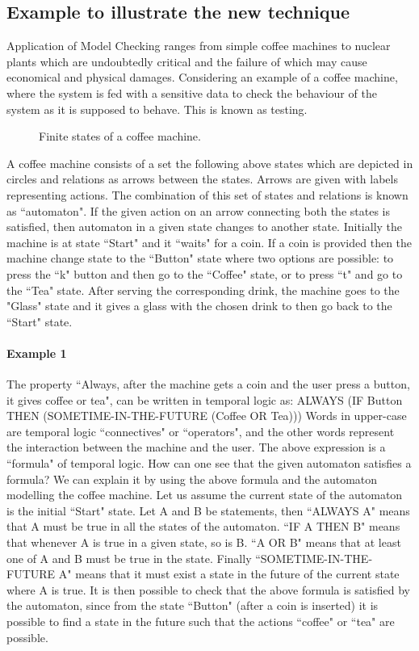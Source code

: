 \documentclass[a4paper,12pt]{extarticle}
\begin{document}
\subsection{Example to illustrate the new technique}
\label{Example}
Application of Model Checking ranges from simple coffee machines to nuclear plants which are undoubtedly critical and the failure of which may cause economical and physical damages. Considering an example of a coffee machine, where the system is fed with a sensitive data to check the behaviour of the system as it is supposed to behave. This is known as testing. 
 \begin{figure}[h!]
 \centering
\caption{Finite states of a coffee machine.}
 \end{figure}
 A coffee machine consists of a set the following above states which are depicted in circles and relations as arrows between the states. Arrows are given with labels representing actions. The combination of this set of states and relations is known as ``automaton".  If the given action on an arrow connecting both the states is satisfied, then automaton in a given state changes to another state. 
Initially the machine is at state ``Start" and it ``waits" for a coin. If a coin is provided then the machine change state to the ``Button" state where two options are possible: to press the ``k" button and then go to the ``Coffee" state, or to press ``t" and go to the ``Tea" state. After serving the corresponding drink, the machine goes to the "Glass" state and it gives a glass with the chosen drink to then go back to the ``Start" state.
\paragraph{Example 1}
The property ``Always, after the machine gets a coin and the user press a button, it gives coffee or tea", can be written in temporal logic as:
ALWAYS (IF Button THEN (SOMETIME-IN-THE-FUTURE (Coffee OR Tea)))
Words in upper-case are temporal logic ``connectives" or ``operators", and the other words represent the interaction between the machine and the user. The above expression is a ``formula" of temporal logic.
How can one see that the given automaton satisfies a formula? We can explain it by using the above formula and the automaton modelling the coffee machine.
Let us assume the current state of the automaton is the initial ``Start" state. Let A and B be statements, then ``ALWAYS A" means that A must be true in all the states of the automaton. ``IF A THEN B" means that whenever A is true in a given state, so is B. ``A OR B" means that at least one of A and B must be true in the state. Finally ``SOMETIME-IN-THE-FUTURE A" means that it must exist a state in the future of the current state where A is true.
It is then possible to check that the above formula is satisfied by the automaton, since from the state ``Button" (after a coin is inserted) it is possible to find a state in the future such that the actions ``coffee" or ``tea" are possible.
\end{document}
